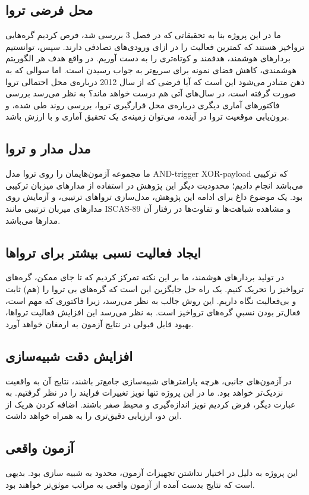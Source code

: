 \subsection{محل فرضی تروا}
ما در این پروژه بنا به تحقیقاتی که در فصل 3 بررسی شد، فرص کردیم گره‌هایی تروا‌خیز هستند که کمترین فعالیت را در ازای ورودی‌های تصادفی دارند. سپس، توانستیم بردارهای هوشمند، هدفمند و کوتاه‌تری را به دست آوریم. در واقع هدف هر الگوریتم هوشمندی، کاهش فضای نمونه برای سریع‌تر به جواب رسیدن است.  اما سوالی که به ذهن متبادر می‌شود این است که آیا فرضی که از سال 2012 درباره‌ی محل احتمالی تروا صورت گرفته است، در سال‌های آتی هم درست خواهد ماند؟ به نظر می‌رسد بررسی فاکتورهای آماری دیگری درباره‌ی محل قرارگیری تروا، بررسی روند طی شده، و برون‌یابی موقعیت تروا در آینده، می‌توان زمینه‌ی یک تحقیق آماری و با ارزش باشد.
\subsection{مدل مدار و تروا}
ما مجموعه آزمون‌هایمان را روی تروا مدل AND-trigger XOR-payload که ترکیبی می‌باشد انجام دادیم؛ محدودیت دیگر این پژوهش در استفاده از مدارهای میزبان ترکیبی بود. یک موضوع داغ برای ادامه این پژوهش، مدل‌سازی تروا‌های ترتیبی، و آزمایش روی مدارهای میربان ترتیبی مانند ISCAS-89 و مشاهده شباهت‌ها و تفاوت‌ها در رفتار آن مدارها می‌باشد.
\subsection{ایجاد فعالیت نسبی بیشتر برای تروا‌ها}
در تولید بردارهای هوشمند، ما بر این نکته تمرکز کردیم که تا جای ممکن، گره‌های تروا‌خیز را تحریک کنیم. یک راه حل جایگزین این است که گره‌های بی تروا را (هم) ثابت و بی‌فعالیت نگاه داریم. این روش جالب به نظر می‌رسد، زیرا فاکتوری که مهم است، فعال‌تر بودن نسبیِ گره‌های تروا‌خیز است. به نظر می‌رسد این افزایش فعالیت تروا‌ها، بهبود قابل قبولی در نتایج آزمون به ارمغان خواهد آورد.
\subsection{افزایش دقت شبیه‌سازی}
در آزمون‌های جانبی، هرچه پارامترهای شبیه‌سازی جامع‌تر باشند، نتایج آن به واقعیت نزدیک‌تر خواهد بود. ما در این پروژه تنها نویز تغییرات فرایند را در نظر گرفتیم. به عبارت دیگر، فرض کردیم نویز اندازه‌گیری و محیط صفر باشند. اضافه کردن هریک از این دو، ارزیابی دقیق‌تری را به همراه خواهد داشت.
\subsection{آزمون واقعی}
این پروژه به دلیل در اختیار نداشتن تجهیزات آزمون، محدود به شبیه سازی بود. بدیهی است که نتایج بدست آمده از آزمون واقعی به مراتب موثق‌تر خواهند بود. 
